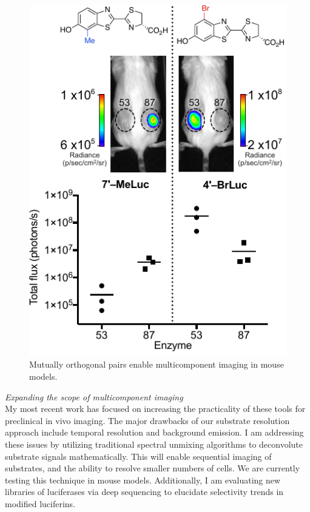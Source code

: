 \documentclass[11pt]{article}
\begin{document}
\begin{figure}
\vspace{-0.2in}
\begin{centering}
\includegraphics[width=\textwidth]{figures/Previous_research/just_mice.pdf}

\end{centering}
\footnotesize
\caption{\label{figure:mice}
Mutually orthogonal pairs enable multicomponent imaging in mouse models.
}
\end{figure}

\textit{Expanding the scope of multicomponent imaging}\\
My most recent work has focused on increasing the practicality of these tools for preclinical in vivo imaging. The major drawbacks of our substrate resolution approach include temporal resolution and background emission. I am addressing these issues by utilizing traditional spectral unmixing algorithms to deconvolute substrate signals mathematically. This will enable sequential imaging of substrates, and the ability to resolve smaller numbers of cells. We are currently testing this technique in mouse models. Additionally, I am evaluating new libraries of luciferases via deep sequencing to elucidate selectivity trends in modified luciferins. %
\end{document}
